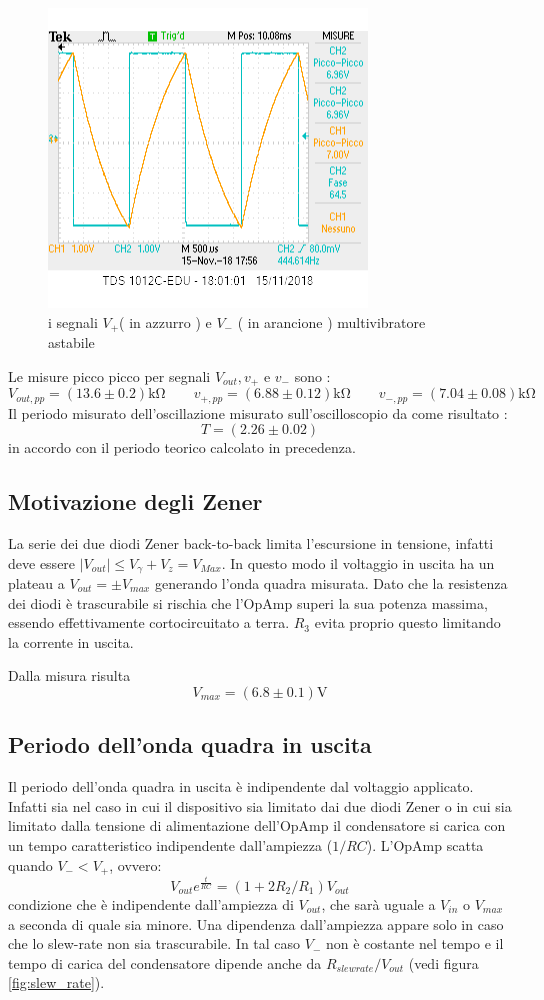 \documentclass[10pt,a4paper]{article}
\begin{document}
 \begin{figure}[h]
 	\centering
 		\includegraphics[scale=0.8]{v+_v-.png}
 		\caption{\small i segnali $V_+$( in azzurro ) e $ V_-$ ( in arancione )  multivibratore astabile}
 		\label{fig:V+V-}
 \end{figure}
Le misure picco picco per  segnali  $V_{out}, v_{+}$ e $v_{-}$ sono :
\[ V_{out,pp}= (13.6\pm 0.2)\si{\kilo\ohm} \qquad  v_{+,pp}= (6.88 \pm 0.12)\si{\kilo\ohm} \qquad   v_{-,pp}= ( 7.04 \pm0.08 ) \si{\kilo\ohm}\]
Il periodo misurato dell'oscillazione misurato sull'oscilloscopio da come risultato :
\[ T = (2.26 \pm 0.02)\]
in accordo con il periodo teorico calcolato in precedenza.

\subsection{Motivazione degli Zener} 
La serie dei due  diodi  Zener back-to-back limita l'escursione in tensione, infatti deve essere $|V_{out}| \le V_{\gamma} +V_{z} = V_{Max}$. In questo modo il voltaggio in uscita ha un plateau a $V_{out} = \pm V_{max}$ generando l'onda quadra misurata. Dato che la resistenza dei diodi è trascurabile si rischia che l'OpAmp superi la sua potenza massima, essendo effettivamente cortocircuitato a terra. $R_3$ evita proprio questo limitando la corrente in uscita.

Dalla misura risulta \[V_{max} = ( 6.8\pm 0.1) \si \volt\]

\subsection{Periodo dell'onda quadra in uscita}
Il periodo dell'onda quadra in uscita è indipendente dal voltaggio applicato. Infatti sia nel caso in cui il dispositivo sia limitato dai due diodi Zener o in cui sia limitato dalla tensione di alimentazione dell'OpAmp il condensatore si carica con un tempo caratteristico indipendente dall'ampiezza ($1/RC$). L'OpAmp scatta quando $V_- < V_+$, ovvero:
\[V_{out} e^{\frac{t}{RC}} = (1+ 2 R_2/R_1) V_{out}\]
condizione che è indipendente dall'ampiezza di $V_{out}$, che sarà uguale a $V_{in}$ o $V_{max}$ a seconda di quale sia minore.
Una dipendenza dall'ampiezza appare solo in caso che lo slew-rate non sia trascurabile. In tal caso $V_-$ non è costante nel tempo e il tempo di carica del condensatore dipende anche da $R_{slew rate} / V_{out}$ (vedi figura \ref{fig:slew_rate}). 
\end{document}
